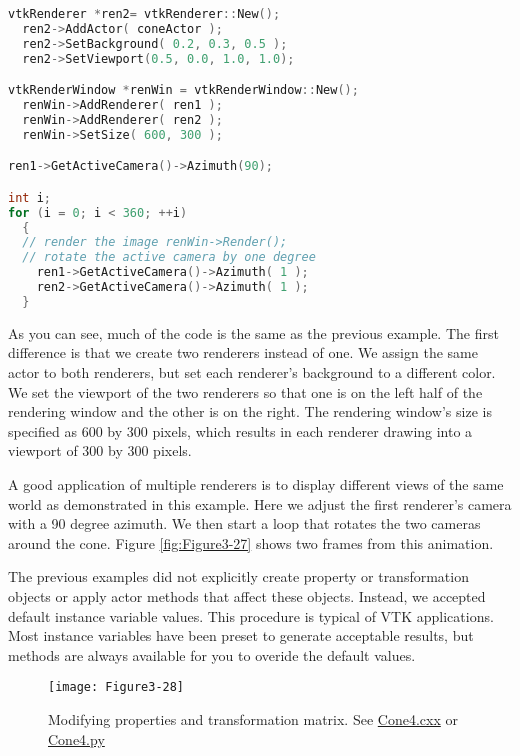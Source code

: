 \begin{description}[leftmargin=0cm,labelindent=0cm]
\begin{lstlisting}[language=C++, caption={Cone3.cxx}]
vtkRenderer *ren2= vtkRenderer::New();
  ren2->AddActor( coneActor );
  ren2->SetBackground( 0.2, 0.3, 0.5 );
  ren2->SetViewport(0.5, 0.0, 1.0, 1.0);

vtkRenderWindow *renWin = vtkRenderWindow::New();
  renWin->AddRenderer( ren1 );
  renWin->AddRenderer( ren2 );
  renWin->SetSize( 600, 300 );

ren1->GetActiveCamera()->Azimuth(90);

int i;
for (i = 0; i < 360; ++i)
  {
  // render the image renWin->Render();
  // rotate the active camera by one degree
    ren1->GetActiveCamera()->Azimuth( 1 );
    ren2->GetActiveCamera()->Azimuth( 1 );
  }
\end{lstlisting}

As you can see, much of the code is the same as the previous example. The first difference is that we create two renderers instead of one. We assign the same actor to both renderers, but set each renderer's background to a different color. We set the viewport of the two renderers so that one is on the left half of the rendering window and the other is on the right. The rendering window's size is specified as 600 by 300 pixels, which results in each renderer drawing into a viewport of 300 by 300 pixels.

A good application of multiple renderers is to display different views of the same world as demonstrated in this example. Here we adjust the first renderer's camera with a 90 degree azimuth. We then start a loop that rotates the two cameras around the cone. Figure \ref{fig:Figure3-27} shows two frames from this animation.

\item[Properties and Transformations.]

The previous examples did not explicitly create property or transformation objects or apply actor methods that affect these objects. Instead, we accepted default instance variable values. This procedure is typical of VTK applications. Most instance variables have been preset to generate acceptable results, but methods are always available for you to overide the default values. 

\begin{figure}[!htb]
  \centering
  \texttt{[image: Figure3-28]}\\
  \caption{Modifying properties and transformation matrix. See  \href{https://lorensen.github.io/VTKExamples/site/Cxx/Rendering/Cone4/}{Cone4.cxx} or \href{https://lorensen.github.io/VTKExamples/site/Python/Rendering/Cone4/}{Cone4.py}}\label{fig:Figure3-28}
\end{figure}


\end{description}
